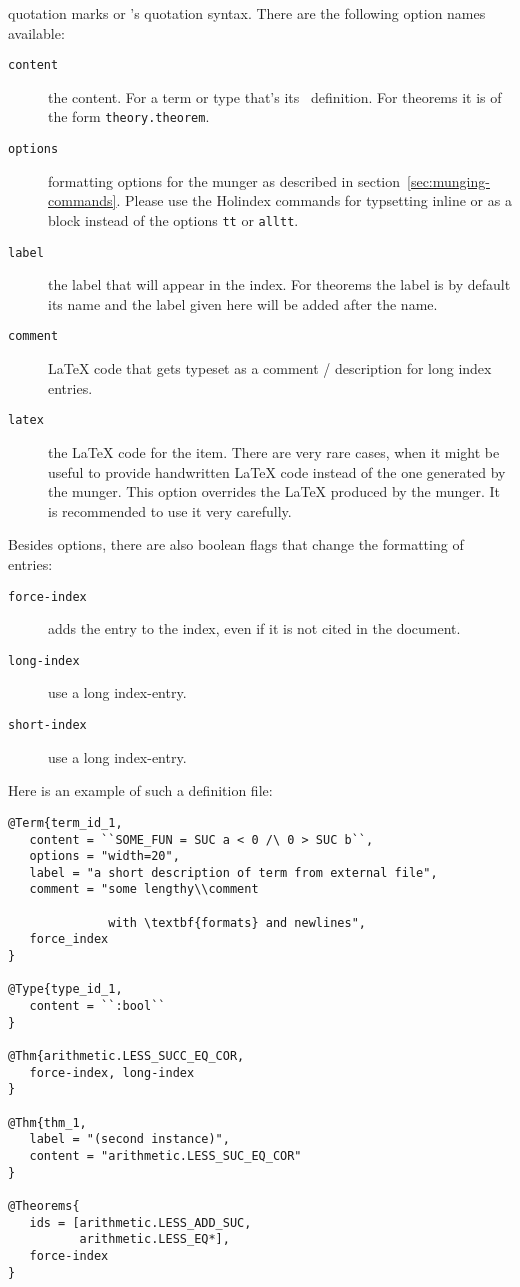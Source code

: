 quotation marks or \HOL{}'s quotation syntax. There are the following
option names available:
\begin{description}
  \item[\texttt{content}]
    the content. For a term or type that's its \HOL{}\ definition.
    For theorems it is of the form \texttt{theory.theorem}.
  \item[\texttt{options}]
    formatting options for the munger as described in section~\ref{sec:munging-commands}.
    Please use the Holindex commands for typsetting inline or as a block instead
    of the options \texttt{tt} or \texttt{alltt}.
  \item[\texttt{label}] the label that will appear in the index. For
    theorems the label is by default its name and the label given here
    will be added after the name.
  \item[\texttt{comment}] \LaTeX{} code that gets typeset as a comment / description
    for long index entries.
  \item[\texttt{latex}] the \LaTeX{} code for the item. There are very rare cases,
    when it might be useful to provide handwritten \LaTeX{} code instead of the one
    generated by the munger. This option overrides the \LaTeX{} produced by the munger.
    It is recommended to use it very carefully.
\end{description}
Besides options, there are also boolean flags that change the formatting of entries:
\begin{description}
  \item[\texttt{force-index}]
    adds the entry to the index, even if it is not cited in the document.
  \item[\texttt{long-index}]
    use a long index-entry.
  \item[\texttt{short-index}]
    use a long index-entry.
\end{description}
Here is an example of such a \HOL{} definition file:

\begin{verbatim}
@Term{term_id_1,
   content = ``SOME_FUN = SUC a < 0 /\ 0 > SUC b``,
   options = "width=20",
   label = "a short description of term from external file",
   comment = "some lengthy\\comment

              with \textbf{formats} and newlines",
   force_index
}

@Type{type_id_1,
   content = ``:bool``
}

@Thm{arithmetic.LESS_SUCC_EQ_COR,
   force-index, long-index
}

@Thm{thm_1,
   label = "(second instance)",
   content = "arithmetic.LESS_SUC_EQ_COR"
}

@Theorems{
   ids = [arithmetic.LESS_ADD_SUC,
          arithmetic.LESS_EQ*],
   force-index
}
\end{verbatim}


